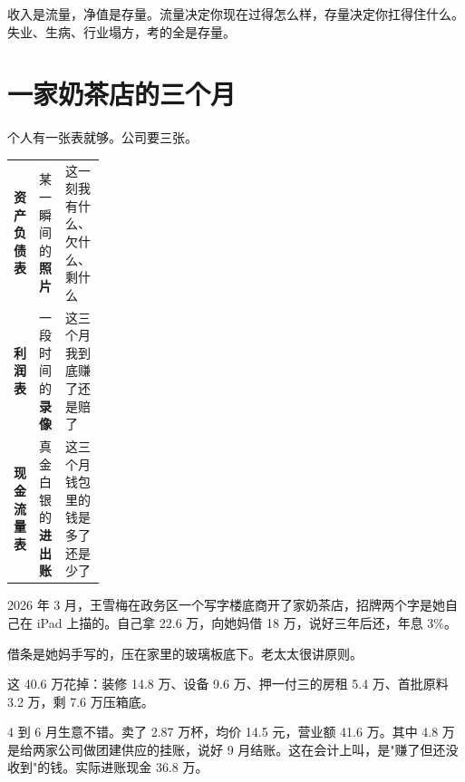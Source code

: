 收入是流量，净值是存量。流量决定你现在过得怎么样，存量决定你扛得住什么。失业、生病、行业塌方，考的全是存量。

\section{一家奶茶店的三个月}

个人有一张表就够。公司要三张。

\begin{tablewrap}
\begin{xltabular}{\linewidth}{>{\raggedright\arraybackslash}p{0.20\linewidth}XX}
\toprule
{} &  &  \\
\midrule
\textbf{资产负债表} & 某一瞬间的\textbf{照片} & 这一刻我有什么、欠什么、剩什么 \\
\textbf{利润表} & 一段时间的\textbf{录像} & 这三个月我到底赚了还是赔了 \\
\textbf{现金流量表} & 真金白银的\textbf{进出账} & 这三个月钱包里的钱是多了还是少了 \\
\bottomrule
\end{xltabular}
\end{tablewrap}

2026 年 3 月，王雪梅在政务区一个写字楼底商开了家奶茶店，招牌两个字是她自己在 iPad 上描的。自己拿 22.6 万，向她妈借 18 万，说好三年后还，年息 3\%。

借条是她妈手写的，压在家里的玻璃板底下。老太太很讲原则。

这 40.6 万花掉：装修 14.8 万、设备 9.6 万、押一付三的房租 5.4 万、首批原料 3.2 万，剩 7.6 万压箱底。

\begin{bsheet}
\end{bsheet}

4 到 6 月生意不错。卖了 2.87 万杯，均价 14.5 元，营业额 41.6 万。其中 4.8 万是给两家公司做团建供应的挂账，说好 9 月结账。这在会计上叫，是"赚了但还没收到"的钱。实际进账现金 36.8 万。

